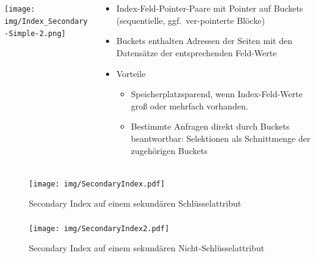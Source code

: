 \begin{frame}{\insertsection}
\framesubtitle{\insertsubsection}
\\[4pt]
\begin{columns}[T]
	\begin{column}{.33\textwidth}
		\texttt{[image: img/Index\_Secondary-Simple-2.png]}
	\end{column}
	\begin{column}{.64\textwidth}
		\begin{itemize}
			\item Index-Feld-Pointer-Paare mit Pointer auf Buckets (sequentielle, ggf.~ver-pointerte Bl\"ocke)
			\item Buckets enthalten Adressen der Seiten mit den Datens\"atze der entsprechenden Feld-Werte
			\pause
			\item Vorteile
			\begin{itemize}
				\item Speicherplatzsparend, wenn Index-Feld-Werte {gro\ss} oder mehrfach vorhanden.
				\item Bestimmte Anfragen direkt durch Buckets beantwortbar: 
				Selektionen als Schnittmenge der zugeh\"origen Buckets
			\end{itemize}
		\end{itemize}	
	\end{column}
\end{columns}
\end{frame}

\begin{frame}{\insertsection}
\framesubtitle{\insertsubsection}
\begin{figure}
	\texttt{[image: img/SecondaryIndex.pdf]}
	\caption{Secondary Index auf einem sekundären Schlüsselattribut}
\end{figure}
\end{frame}

\begin{frame}{\insertsection}
\framesubtitle{\insertsubsection}
\begin{figure}
\texttt{[image: img/SecondaryIndex2.pdf]}
\caption{Secondary Index auf einem sekundären Nicht-Schlüsselattribut}
\end{figure}
\end{frame}

